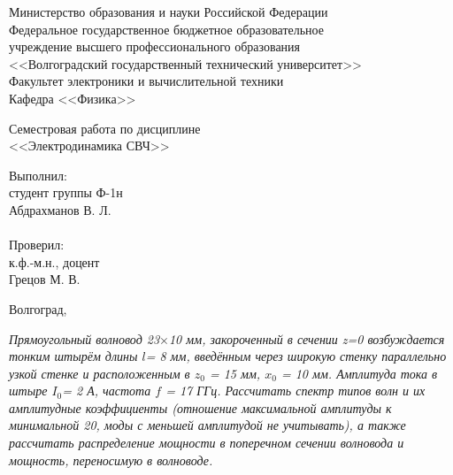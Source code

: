 \documentclass[a4paper,12pt]{extarticle}
\begin{document}
	\begin{titlepage}
        \begin{center}
          Министерство образования и науки Российской Федерации \\
          Федеральное государственное бюджетное образовательное \\
          учреждение высшего профессионального образования \\
          <<Волгоградский государственный технический университет>> \\
          Факультет электроники и вычислительной техники\\
          Кафедра <<Физика>>
        \end{center}
        \vspace{9em}
        \begin{center}
          \large
          Семестровая работа
		  по дисциплине\\
		  <<Электродинамика СВЧ>>\\
        \end{center}
        \vspace{5em}
        \begin{flushright}
          \begin{minipage}{.40\textwidth}
            Выполнил:\\
            студент группы Ф-1н\\
            Абдрахманов В. Л.\\
            \vspace{1em}\\
            Проверил:\\
            к.ф.-м.н., доцент\\
            Грецов М. В.
          \end{minipage}
        \end{flushright}
        \vspace{\fill}
        \begin{center}
          Волгоград, \the\year
        \end{center}
    \end{titlepage}
    \setcounter{page}{2}
	\emph{
	Прямоугольный волновод 23\(\times\)10 мм, закороченный в сечении z=0 возбуждается тонким штырём длины \( l \)= 8 мм, введённым через широкую стенку параллельно узкой стенке и расположенным в \( z_0 \) = 15 мм, \( x_0 \) = 10 мм. Амплитуда тока в штыре \( I_0 \)= 2 А, частота \( f \) = 17 ГГц. Рассчитать спектр типов волн и их амплитудные коэффициенты (отношение максимальной амплитуды к минимальной 20, моды с меньшей амплитудой не учитывать), а также рассчитать распределение мощности в поперечном сечении волновода и мощность, переносимую в волноводе.
	}
	\vspace*{1cm}
\end{document}
